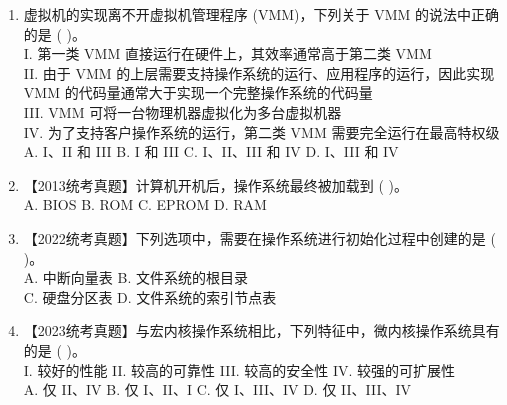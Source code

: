 \documentclass[lang=cn,newtx,10pt,scheme=chinese]{../../elegantbook}
\begin{document}
\begin{enumerate}
    \item 虚拟机的实现离不开虚拟机管理程序 (VMM)，下列关于 VMM 的说法中正确的是 (    )。\\
    I. 第一类 VMM 直接运行在硬件上，其效率通常高于第二类 VMM\\
    II. 由于 VMM 的上层需要支持操作系统的运行、应用程序的运行，因此实现 VMM 的代码量通常大于实现一个完整操作系统的代码量\\
    III. VMM 可将一台物理机器虚拟化为多台虚拟机器\\
    IV. 为了支持客户操作系统的运行，第二类 VMM 需要完全运行在最高特权级\\
    A. I、II 和 III \quad B. I 和 III \quad C. I、II、III 和 IV \quad D. I、III 和 IV

    \item 【2013统考真题】计算机开机后，操作系统最终被加载到 (    )。\\
    A. BIOS \quad B. ROM \quad C. EPROM \quad D. RAM

    \item 【2022统考真题】下列选项中，需要在操作系统进行初始化过程中创建的是 (    )。\\
    A. 中断向量表 \quad B. 文件系统的根目录\\
    C. 硬盘分区表 \quad D. 文件系统的索引节点表
    \item 【2023统考真题】与宏内核操作系统相比，下列特征中，微内核操作系统具有的是 (    )。\\
  I. 较好的性能 \quad II. 较高的可靠性 \quad III. 较高的安全性 \quad IV. 较强的可扩展性\\
  A. 仅 II、IV \quad B. 仅 I、II、I \quad C. 仅 I、III、IV \quad D. 仅 II、III、IV
\end{enumerate}
\end{document}
